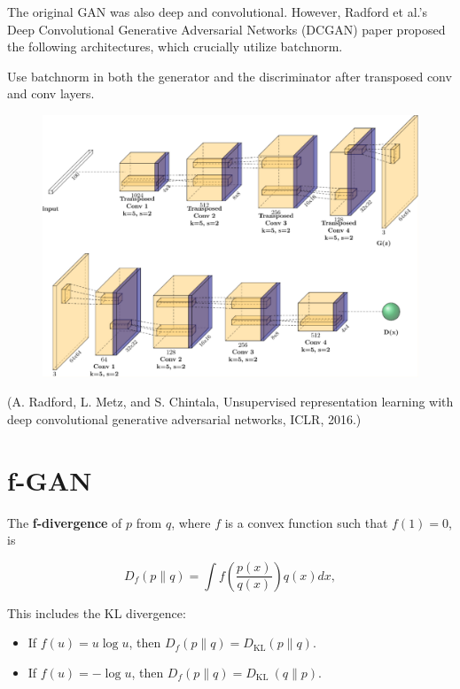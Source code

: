 \begin{definition}[12.14][DCGAN]
    The original GAN was also deep and convolutional.
    However, Radford et al.'s Deep Convolutional Generative Adversarial Networks (DCGAN) paper proposed the following architectures, which crucially utilize batchnorm.

    Use batchnorm in both the generator and the discriminator after transposed conv and conv layers.

    \begin{figure}[H]
        \centering
        \includegraphics[width=1.0\textwidth]{.././assets/12.3.png}
    \end{figure}

    (A. Radford, L. Metz, and S. Chintala, Unsupervised representation learning with deep convolutional generative adversarial networks, ICLR, 2016.)
\end{definition}

\section{f-GAN}

\begin{definition}[12.15][f-Divergence]
    The \textbf{f-divergence} of $p$ from $q$, where $f$ is a convex function such that $f(1)=0$, is

    $$
    D_{f}(p \| q)=\int f\left(\frac{p(x)}{q(x)}\right) q(x) d x,
    $$

    This includes the KL divergence:

    \begin{itemize}
        \item If $f(u)=u \log u$, then $D_{f}(p \| q)=D_{\mathrm{KL}}(p \| q)$.
        \item If $f(u)=-\log u$, then $D_{f}(p \| q)=D_{\text {KL }}(q \| p)$.
    \end{itemize}
\end{definition}

